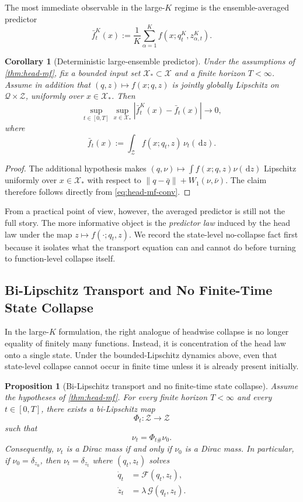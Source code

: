 \documentclass{article}
\newtheorem{proposition}[theorem]{Proposition}
\newtheorem{corollary}[theorem]{Corollary}
\theoremstyle{definition}
\newcommand{\W}{W_1}
\newcommand{\dd}{\,\mathrm{d}}
\begin{document}
The most immediate observable in the large-$K$ regime is the ensemble-averaged predictor
\[
  \bar f_t^K(x) := \frac1K\sum_{\alpha=1}^K f(x;q_t^K,z_{\alpha,t}^K).
\]

\begin{corollary}[Deterministic large-ensemble predictor]
\label{cor:predictor}
Under the assumptions of \cref{thm:head-mf}, fix a bounded input set $\mathcal X_\ast\subset\mathcal X$ and a finite horizon $T<\infty$. Assume in addition that $(q,z)\mapsto f(x;q,z)$ is jointly globally Lipschitz on $\mathcal Q\times\mathcal Z$, uniformly over $x\in\mathcal X_\ast$. Then
\[
  \sup_{t\in[0,T]}\sup_{x\in\mathcal X_\ast}
  \left|
    \bar f_t^K(x) - \bar f_t(x)
  \right|
  \to 0,
\]
where
\[
  \bar f_t(x)
  :=
  \int_{\mathcal Z} f(x;q_t,z)\,\nu_t(\dd z).
\]
\end{corollary}

\begin{proof}
The additional hypothesis makes $(q,\nu)\mapsto \int f(x;q,z)\nu(\dd z)$ Lipschitz uniformly over $x\in\mathcal X_\ast$ with respect to $\|q-\bar q\|+\W(\nu,\bar\nu)$. The claim therefore follows directly from \eqref{eq:head-mf-conv}.
\end{proof}

From a practical point of view, however, the averaged predictor is still not the full story. The more informative object is the \emph{predictor law} induced by the head law under the map $z\mapsto f(\cdot;q_t,z)$. We record the state-level no-collapse fact first because it isolates what the transport equation can and cannot do before turning to function-level collapse itself.

\subsection{Bi-Lipschitz Transport and No Finite-Time State Collapse}

In the large-$K$ formulation, the right analogue of headwise collapse is no longer equality of finitely many functions. Instead, it is concentration of the head law onto a single state. Under the bounded-Lipschitz dynamics above, even that state-level collapse cannot occur in finite time unless it is already present initially.

\begin{proposition}[Bi-Lipschitz transport and no finite-time state collapse]
\label{prop:mono}
Assume the hypotheses of \cref{thm:head-mf}. For every finite horizon $T<\infty$ and every $t\in[0,T]$, there exists a bi-Lipschitz map
\[
  \Phi_t:\mathcal Z\to\mathcal Z
\]
such that
\[
  \nu_t = \Phi_{t\#}\nu_0.
\]
Consequently, $\nu_t$ is a Dirac mass if and only if $\nu_0$ is a Dirac mass. In particular, if $\nu_0=\delta_{z_0}$, then $\nu_t=\delta_{z_t}$ where $(q_t,z_t)$ solves
\begin{align}
  \dot q_t &= \mathcal F(q_t,z_t),
  \label{eq:mono-q}
  \\
  \dot z_t &= \lambda\,\mathcal G(q_t,z_t).
  \label{eq:mono-z}
\end{align}
\end{proposition}
\end{document}
